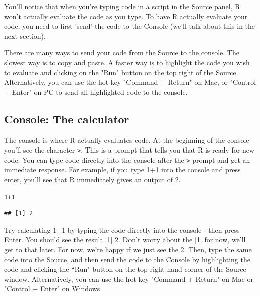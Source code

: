 \documentclass{tufte-book}\usepackage[]{graphicx}\usepackage[]{color}
\makeatletter
\newcommand{\hlnum}[1]{\textcolor[rgb]{0.686,0.059,0.569}{#1}}%
\newcommand{\hlopt}[1]{\textcolor[rgb]{0,0,0}{#1}}%
\newenvironment{kframe}{%
 \def\at@end@of@kframe{}%
 \ifinner\ifhmode%
  \def\at@end@of@kframe{\end{minipage}}%
  \begin{minipage}{\columnwidth}%
 \fi\fi%
 \def\FrameCommand##1{\hskip\@totalleftmargin \hskip-\fboxsep
 \colorbox{shadecolor}{##1}\hskip-\fboxsep
     \hskip-\linewidth \hskip-\@totalleftmargin \hskip\columnwidth}%
 \MakeFramed {\advance\hsize-\width
   \@totalleftmargin\z@ \linewidth\hsize
   \@setminipage}}%
 {\par\unskip\endMakeFramed%
 \at@end@of@kframe}
\newenvironment{knitrout}{}{} %
\makeatother
\begin{document}
You'll notice that when you're typing code in a script in the Source panel, R won't actually evaluate the code as you type. To have R actually evaluate your code, you need to first 'send' the code to the Console (we'll talk about this in the next section).

There are many ways to send your code from the Source to the console. The slowest way is to copy and paste. A faster way is to highlight the code you wish to evaluate and clicking on the "Run" button on the top right of the Source. Alternatively, you can use the hot-key "Command + Return" on Mac, or "Control + Enter" on PC to send all highlighted code to the console.

\subsection{Console: The calculator}

The console is where R actually evaluates code. At the beginning of the console you'll see the character \texttt{>}. This is a prompt that tells you that R is ready for new code. You can type code directly into the console after the \texttt{>} prompt and get an immediate response. For example, if you type 1+1 into the console and press enter, you'll see that R immediately gives an output of 2.


\begin{knitrout}
\color{fgcolor}\begin{kframe}
\begin{alltt}
\hlnum{1}\hlopt{+}\hlnum{1}
\end{alltt}
\begin{verbatim}
## [1] 2
\end{verbatim}
\end{kframe}
\end{knitrout}


Try calculating 1+1 by typing the code directly into the console - then press Enter. You should see the result [1] 2. Don't worry about the [1] for now, we'll get to that later. For now, we're happy if we just see the 2. Then, type the same code into the Source, and then send the code to the Console by highlighting the code and clicking the ``Run" button on the top right hand corner of the Source window. Alternatively, you can use the hot-key "Command + Return" on Mac or "Control + Enter" on Windows.

\end{document}
